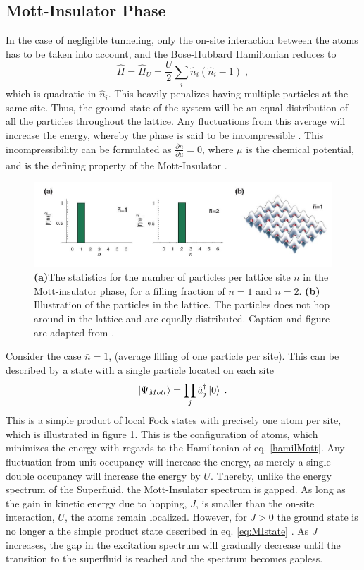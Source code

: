 \subsection{Mott-Insulator Phase}
In the case of negligible tunneling, only the on-site interaction between the atoms has to be taken into account, and the Bose-Hubbard Hamiltonian reduces to
\begin{equation}
	\hat{H} = \hat{H}_U = \frac{U}{2} \sum_{i} \hat{n}_i \left( \hat{n}_i -1 \right) \; ,
	\label{hamilMott}
\end{equation}
which is quadratic in $\hat{n}_i$. This heavily penalizes having multiple particles at the same site. Thus, the ground state of the system will be an equal distribution of all the particles throughout the lattice. Any fluctuations from this average will increase the energy, whereby the phase is said to be incompressible \cite{Gemelke2009}. This incompressibility can be formulated as $\frac{\partial n}{\partial \mu} = 0$, where $\mu$ is the chemical potential, and is the defining property of the Mott-Insulator \cite{manybodyBloch}.\\
\begin{figure}[!h]
\centering
\includegraphics[width=0.8\columnwidth]{Figures/f(n)_M.JPG} 
\caption{\textbf{(a)}The statistics for the number of particles per lattice site $n$ in the Mott-insulator phase, for a filling fraction of $\bar{n}=1$ and $\bar{n}=2$. \textbf{(b)} Illustration of the particles in the lattice. The particles does not hop around in the lattice and are equally distributed. Caption and figure are adapted from \cite{greiner}.}
\label{fig:f(n)_M} 
\end{figure}
Consider the case $\bar{n} = 1$, (average filling of one particle per site). This can be described by a state with a single particle located on each site \cite{manybodyBloch}
\begin{equation}
	\ket{\Psi_{Mott}} = \prod_j \hat{a}_{j}^{\dag} \ket{0} \; .
	\label{eq:MIstate}
\end{equation}
This is a simple product of local Fock states with precisely
one atom per site, which is illustrated in figure \ref{fig:f(n)_M}. This is the configuration of atoms, which minimizes the energy with regards to the Hamiltonian of eq. \eqref{hamilMott}. Any fluctuation from unit occupancy will increase the energy, as merely a single double occupancy will increase the energy by $U$. Thereby, unlike the energy spectrum of the Superfluid, the Mott-Insulator spectrum is gapped. As long as the gain in kinetic energy due to hopping, $J$, is smaller than the on-site interaction, $U$, the atoms remain localized. However, for $J > 0$ the ground state is no longer a the simple product state described in eq. \eqref{eq:MIstate} \cite{manybodyBloch}. As $J$ increases, the gap in the excitation spectrum will gradually decrease until the transition to the superfluid is reached and the spectrum becomes gapless.\\
